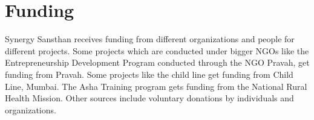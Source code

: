 \section{Funding}
	Synergy Sansthan receives funding from different organizations and people for different projects. Some projects which are conducted under bigger NGOs like the Entrepreneurship Development Program conducted through the NGO Pravah, get funding from Pravah. Some projects like the child line get funding from Child Line, Mumbai. The Asha Training program gets funding from the National Rural Health Mission. Other sources include voluntary donations by individuals and organizations.









